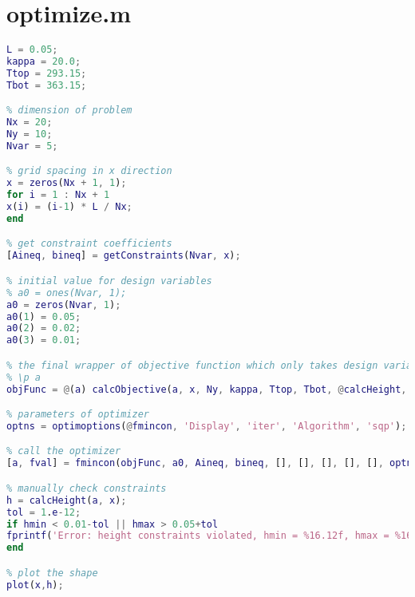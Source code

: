 \documentclass[a4paper]{article}
\begin{document}
\begin{appendices}
\begin{lstlisting}[language=Matlab]
\end{lstlisting}

\section{optimize.m}\label{app:opt}
\begin{lstlisting}[language=Matlab]
% speficy some parameters of physics
L = 0.05;
kappa = 20.0;
Ttop = 293.15;
Tbot = 363.15;

% dimension of problem
Nx = 20;
Ny = 10;
Nvar = 5;

% grid spacing in x direction
x = zeros(Nx + 1, 1);
for i = 1 : Nx + 1
x(i) = (i-1) * L / Nx;
end

% get constraint coefficients
[Aineq, bineq] = getConstraints(Nvar, x);

% initial value for design variables
% a0 = ones(Nvar, 1);
a0 = zeros(Nvar, 1);
a0(1) = 0.05;
a0(2) = 0.02;
a0(3) = 0.01;

% the final wrapper of objective function which only takes design variable
% \p a
objFunc = @(a) calcObjective(a, x, Ny, kappa, Ttop, Tbot, @calcHeight, @CalcFlux);

% parameters of optimizer
optns = optimoptions(@fmincon, 'Display', 'iter', 'Algorithm', 'sqp');

% call the optimizer
[a, fval] = fmincon(objFunc, a0, Aineq, bineq, [], [], [], [], [], optns);

% manually check constraints
h = calcHeight(a, x);
tol = 1.e-12;
if hmin < 0.01-tol || hmax > 0.05+tol
fprintf('Error: height constraints violated, hmin = %16.12f, hmax = %16.12f.\n', hmin, hmax);
end

% plot the shape
plot(x,h);
\end{lstlisting}
\end{appendices}
\end{document}
